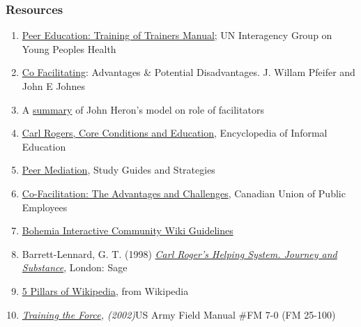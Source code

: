 \subsubsection{Resources}

\begin{enumerate}
\item
  \href{http://www.scribd.com/doc/54544925/51/TRAINING-TOPIC-Co-facilitation-skills}{Peer
  Education: Training of Trainers Manual}; UN Interagency Group on Young
  Peoples Health
\item
  \href{http://www.breakoutofthebox.com/Co-FacilitatingPfeifferJones.pdf}{Co
  Facilitating}: Advantages \& Potential Disadvantages. J. Willam
  Pfeifer and John E Johnes
\item
  A
  \href{http://reviewing.co.uk/archives/art/13\_1\_what\_do\_facilitators\_do.htm\#8\_WAYS\_OF\_FACILITATING\_ACTIVE\_LEARNING}{summary}
  of John Heron's model on role of facilitators
\item
  \href{http://www.infed.org/thinkers/et-rogers.htm}{C}\href{http://www.infed.org/thinkers/et-rogers.htm}{arl
  Rogers, Core Conditions and Education}, Encyclopedia of Informal
  Education
\item
  \href{http://www.studygs.net/peermed.htm}{Peer Mediation}, Study
  Guides and Strategies
\item
  \href{http://sk.cupe.ca/updir/cofacilitation-handouts.doc}{Co-Facilitation:
  The Advantages and Challenges}, Canadian Union of Public Employees
\item
  \href{http://community.bistudio.com/wiki/Bohemia\_Interactive\_Community:Guidelines}{Bohemia
  Interactive Community Wiki Guidelines}
\item
  Barrett-Lennard, G. T. (1998)
  \href{http://openlibrary.org/works/OL2014352W/Carl\_Rogers'\_Helping\_System}{\emph{Carl
  Roger's Helping System. Journey and Substance}}, London: Sage
\item
  \href{http://en.wikipedia.org/w/index.php?title=Wikipedia:Five\_pillars\&oldid=501472166}{5
  Pillars of Wikipedia}, from Wikipedia
\item
  \emph{\href{http://www.africom.mil/WO-NCO/DownloadCenter/\%5C40Publications/Training\%20the\%20Force\%20Manual.pdf}{Training
  the Force}, (2002)}US Army Field Manual \#FM 7-0 (FM 25-100)
\end{enumerate}
